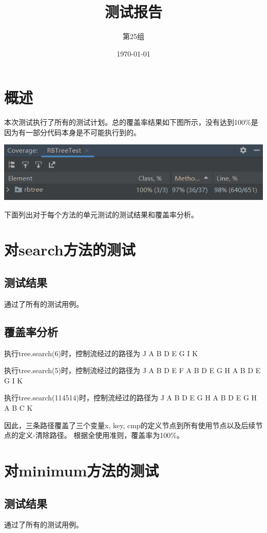 \documentclass[12pt, a4paper, oneside]{ctexart}
\title{\textbf{测试报告}}
\author{第25组}
\date{\today}
\begin{document}
\maketitle

\section{概述}
本次测试执行了所有的测试计划。总的覆盖率结果如下图所示，没有达到100\%是因为有一部分代码本身是不可能执行到的。

\includegraphics[scale=0.5]{screenshots/coverage.png}

下面列出对于每个方法的单元测试的测试结果和覆盖率分析。

\section{对search方法的测试}

\subsection{测试结果}
通过了所有的测试用例。

\subsection{覆盖率分析}
执行tree.search(6)时，控制流经过的路径为 J A B D E G I K

执行tree.search(5)时，控制流经过的路径为 J A B D E F A B D E G H A B D E G I K

执行tree.search(114514)时，控制流经过的路径为 J A B D E G H A B D E G H A B C K

因此，三条路径覆盖了三个变量x, key, cmp的定义节点到所有使用节点以及后续节点的定义-清除路径。
根据全使用准则，覆盖率为100\%。

\section{对minimum方法的测试}

\subsection{测试结果}
通过了所有的测试用例。
\end{document}
